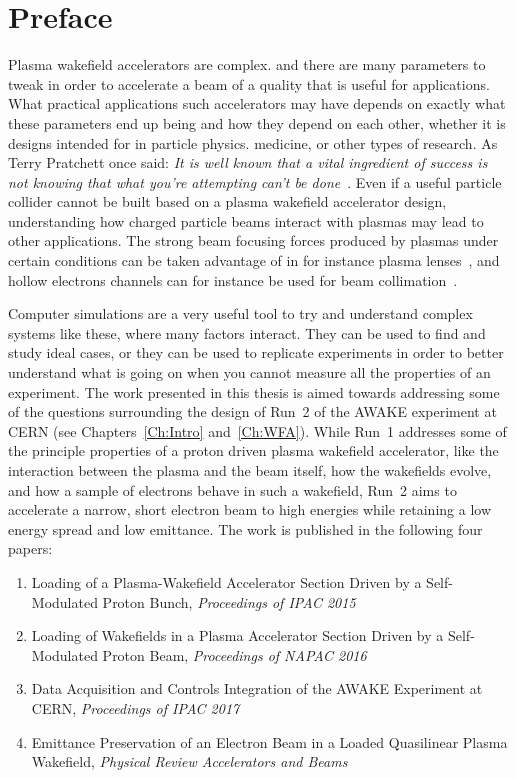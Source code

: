 \chapter*{Preface}

Plasma wakefield accelerators are complex. and there are many parameters to tweak in order to accelerate a beam of a quality that is useful for applications.
What practical applications such accelerators may have depends on exactly what these parameters end up being and how they depend on each other, whether it is designs intended for in particle physics. medicine, or other types of research.
As Terry Pratchett once said: \textit{It is well known that a vital ingredient of success is not knowing that what you're attempting can't be done}~\cite{pratchett:1987}.
Even if a useful particle collider cannot be built based on a plasma wakefield accelerator design, understanding how charged particle beams interact with plasmas may lead to other applications.
The strong beam focusing forces produced by plasmas under certain conditions can be taken advantage of in for instance plasma lenses~\cite{su:1990}, and hollow electrons channels can for instance be used for beam collimation~\cite{stancari:2014}.

Computer simulations are a very useful tool to try and understand complex systems like these, where many factors interact.
They can be used to find and study ideal cases, or they can be used to replicate experiments in order to better understand what is going on when you cannot measure all the properties of an experiment.
The work presented in this thesis is aimed towards addressing some of the questions surrounding the design of Run~2 of the AWAKE experiment at CERN (see Chapters~\ref{Ch:Intro} and~\ref{Ch:WFA}).
While Run~1 addresses some of the principle properties of a proton driven plasma wakefield accelerator, like the interaction between the plasma and the beam itself, how the wakefields evolve, and how a sample of electrons behave in such a wakefield, Run~2 aims to accelerate a narrow, short electron beam to high energies while retaining a low energy spread and low emittance.
The work is published in the following four papers:

\begin{enumerate}[I]
    \item Loading of a Plasma-Wakefield Accelerator Section Driven by a Self-Modulated Proton Bunch, \textit{Proceedings of IPAC 2015} \cite{berglyd_olsen:2015}
    \item Loading of Wakefields in a Plasma Accelerator Section Driven by a Self-Modulated Proton Beam, \textit{Proceedings of NAPAC 2016} \cite{berglyd_olsen:2016}
    \item Data Acquisition and Controls Integration of the AWAKE Experiment at CERN, \textit{Proceedings of IPAC 2017} \cite{berglyd_olsen:2017}
    \item Emittance Preservation of an Electron Beam in a Loaded Quasilinear Plasma Wakefield, \textit{Physical Review Accelerators and Beams} \cite{berglyd_olsen:2018}
\end{enumerate}

